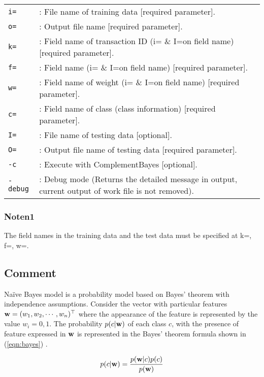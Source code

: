 \begin{table}[htbp]
{\small
\begin{tabular}{ll}

\verb|i=|     &: File name of training data [required parameter].\\
\verb|o=|     &: Output file name [required parameter].\\
\verb|k=|     &: Field name of transaction ID (i= \& I=on field name) [required parameter].\\
\verb|f=|     &: Field name (i= \& I=on field name) [required parameter].\\
\verb|w=|     &: Field name of weight  (i= \& I=on field name) [required parameter].\\
\verb|c=|     &: Field name of class  (class information) [required parameter].\\
\verb|I=|     &: File name of testing data [optional].\\
\verb|O=|     &: Output file name of testing data [required parameter].\\
\verb|-c|     &: Execute with ComplementBayes [optional].\\
\verb|-debug| &: Debug mode (Returns the detailed message in output, current output of work file is not removed).\\
\end{tabular} 
}
\end{table} 

\subsubsection*{Noten1}
The field names in the training data and the test data must be specified at k=, f=, w=.

\subsection*{Comment}

Na{\"i}ve Bayes model is a probability model based on Bayes' theorem with independence assumptions. 
Consider the vector with particular features ${\bf w}=(w_1,w_2,\cdots,w_n)^\top$ where the appearance of the feature is represented by the value $w_i=0,1$.
The probability $p(c|{\bf w})$ of each class $c$, with the presence of feature expressed in ${\bf w}$ is represented in the Bayes' theorem formula shown in (\ref{eqn:bayes}) .

\begin{equation}
p(c|{\bf w})=\frac{p({\bf w}|c)p(c)}{p({\bf w})}
\label{eqn:bayes}
\end{equation}

